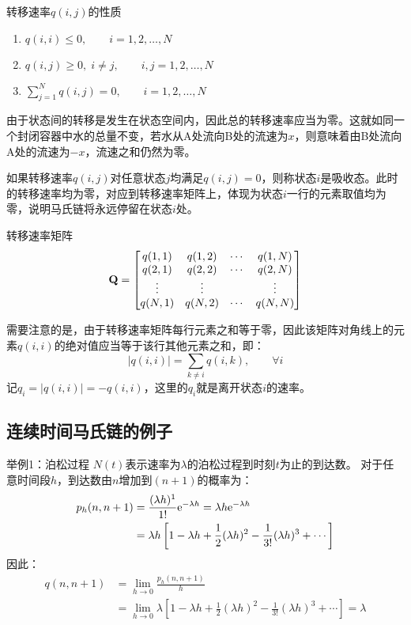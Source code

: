 \documentclass[t]{beamer}
\begin{document}
\begin{frame}{转移速率$q(i,j)$的性质}
  \begin{enumerate}
    \item $q(i,i)\le 0,\qquad i=1,2,\ldots,N$
    \item $q(i,j)\ge 0,\; i\ne j,\qquad i,j=1,2,\ldots,N$
    \item $\sum^N_{j=1}q(i,j)=0,\qquad i=1,2,\ldots,N$
  \end{enumerate}

  由于状态间的转移是发生在状态空间内，因此总的转移速率应当为零。这就如同一个封闭容器中水的总量不变，若水从A处流向B处的流速为$x$，则意味着由B处流向A处的流速为$-x$，流速之和仍然为零。

如果转移速率$q(i,j)$对任意状态$j$均满足$q(i,j)=0$，则称状态$i$是吸收态。此时的转移速率均为零，对应到转移速率矩阵上，体现为状态$i$一行的元素取值均为零，说明马氏链将永远停留在状态$i$处。
\end{frame}


\begin{frame}{转移速率矩阵}
  \[{\bf Q}=\begin{bmatrix}
    q(1,1) & q(1,2) & \cdots & q(1,N)\\
    q(2,1) & q(2,2) & \cdots & q(2,N)\\
    \vdots & \vdots &  & \vdots\\
    q(N,1) & q(N,2) & \cdots & q(N,N)\\
    \end{bmatrix} \]
    
    需要注意的是，由于转移速率矩阵每行元素之和等于零，因此该矩阵对角线上的元素$q(i,i)$的绝对值应当等于该行其他元素之和，即：
    \[|q(i,i)|=\sum_{k\ne i}q(i,k),\qquad \forall i \]
    记$q_i=|q(i,i)|=-q(i,i)$，这里的$q_i$就是离开状态$i$的速率。
    
\end{frame}

\subsection{连续时间马氏链的例子}
\begin{frame}{举例1：泊松过程}
  $N(t)$表示速率为$\lambda$的泊松过程到时刻$t$为止的到达数。 
  对于任意时间段$h$，到达数由$n$增加到$(n+1)$的概率为：
  \[\begin{split}
  p_h(n,n+1)&=\frac{(\lambda h)^1}{1!}{\rm e}^{-\lambda h}=\lambda h {\rm e}^{-\lambda h}\\
  &=\lambda h \left[1-\lambda h+\frac{1}{2}(\lambda h)^2-\frac{1}{3!}(\lambda h)^3+\cdots \right]
  \end{split} \]
  因此：
  \[\begin{split}
  q(n,n+1)&=\lim_{h\to 0}\frac{p_h(n,n+1)}{h}\\
  &=\lim_{h\to 0}\lambda \left[1-\lambda h+\frac{1}{2}(\lambda h)^2-\frac{1}{3!}(\lambda h)^3+\cdots \right]=\lambda
  \end{split} \]
  
\end{frame}
\end{document}
